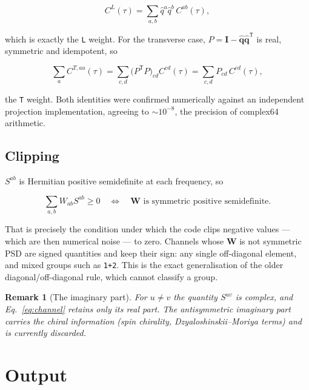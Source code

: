 \documentclass[12pt, a4paper, oneside]{article}
\newtheorem{remark}[theorem]{Remark}
\newcommand{\qhat}{\hat{\mathbf{q}}}
\newcommand{\Wmat}{\mathbf{W}}
\begin{document}
\begin{equation}
    C^L(\tau) = \sum_{a,b}\hat q^a\hat q^b\,C^{ab}(\tau),
\end{equation}

which is exactly the \texttt{L} weight. For the transverse case,
$P = \mathbf{I}-\qhat\qhat^{\mathsf T}$ is real, symmetric and idempotent, so

\begin{equation}
    \sum_a C^{T,aa}(\tau)
    = \sum_{c,d}\bigl(P^{\mathsf T}P\bigr)_{cd}C^{cd}(\tau)
    = \sum_{c,d}P_{cd}\,C^{cd}(\tau),
\end{equation}

the \texttt{T} weight. Both identities were confirmed numerically against an
independent projection implementation, agreeing to $\sim10^{-8}$, the precision
of complex64 arithmetic.

\subsection{Clipping}

$S^{ab}$ is Hermitian positive semidefinite at each frequency, so

\begin{equation}
    \sum_{a,b}W_{ab}S^{ab} \ge 0
    \quad\Longleftrightarrow\quad
    \Wmat \text{ is symmetric positive semidefinite}.
\end{equation}

That is precisely the condition under which the code clips negative values ---
which are then numerical noise --- to zero. Channels whose $\Wmat$ is not
symmetric PSD are signed quantities and keep their sign: any single off-diagonal
element, and mixed groups such as \texttt{1+2}. This is the exact generalisation
of the older diagonal/off-diagonal rule, which cannot classify a group.

\begin{remark}[The imaginary part]
For $u \ne v$ the quantity $S^{uv}$ is complex, and Eq.~\eqref{eq:channel}
retains only its real part. The antisymmetric imaginary part carries the chiral
information (spin chirality, Dzyaloshinskii--Moriya terms) and is currently
discarded.
\end{remark}

\section{Output}
\end{document}
